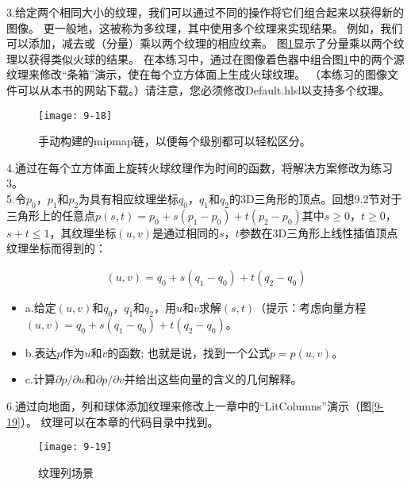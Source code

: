 \begin{flushleft}
3.给定两个相同大小的纹理，我们可以通过不同的操作将它们组合起来以获得新的图像。 更一般地，这被称为多纹理，其中使用多个纹理来实现结果。 例如，我们可以添加，减去或（分量）乘以两个纹理的相应纹素。 图\ref{fig:9-18}显示了分量乘以两个纹理以获得类似火球的结果。 在本练习中，通过在图像着色器中组合图\ref{fig:9-18}中的两个源纹理来修改“条箱”演示，使在每个立方体面上生成火球纹理。 （本练习的图像文件可以从本书的网站下载。）请注意，您必须修改Default.hlsl以支持多个纹理。
\end{flushleft}
\begin{figure}[h]
    \texttt{[image: 9-18]}
    \centering
    \caption{手动构建的mipmap链，以便每个级别都可以轻松区分。}
    \label{fig:9-18}
\end{figure}

\begin{flushleft}
4.通过在每个立方体面上旋转火球纹理作为时间的函数，将解决方案修改为练习3。\\

5.令$p_{0}$，$p_{1}$和$p_{2}$为具有相应纹理坐标$q_{0}$，$q_{1}$和$q_{2}$的3D三角形的顶点。回想9.2节对于三角形上的任意点$p(s,t)=p_{0}+s(p_{1}-p_{0})+t(p_{2}-p_{0})$其中$s\geq 0$，$t\geq 0$，$s+t\leq 1$，其纹理坐标$(u,v)$是通过相同的$s$，$t$参数在3D三角形上线性插值顶点纹理坐标而得到的：\\
\end{flushleft}
\begin{align*}
(u,v)=q_{0}+s(q_{1}-q_{0})+t(q_{2}-q_{0})
\end{align*}

\begin{itemize}
  \item a.给定$(u,v)$和$q_{0}$，$q_{1}$和$q_{2}$，用$u$和$v$求解$(s,t)$（提示：考虑向量方程$(u,v)=q_{0}+s(q_{1}-q_{0})+t(q_{2}-q_{0})$。
  \item b.表达$p$作为$u$和$v$的函数; 也就是说，找到一个公式$p=p(u,v)$。
  \item c.计算$\partial p/\partial u$和$\partial p/\partial v$并给出这些向量的含义的几何解释。
\end{itemize}

\begin{flushleft}
6.通过向地面，列和球体添加纹理来修改上一章中的“LitColumns”演示（图\ref{9-19}）。 纹理可以在本章的代码目录中找到。
\end{flushleft}

\begin{figure}[h]
    \texttt{[image: 9-19]}
    \centering
    \caption{纹理列场景}
    \label{fig:9-19}
\end{figure}





